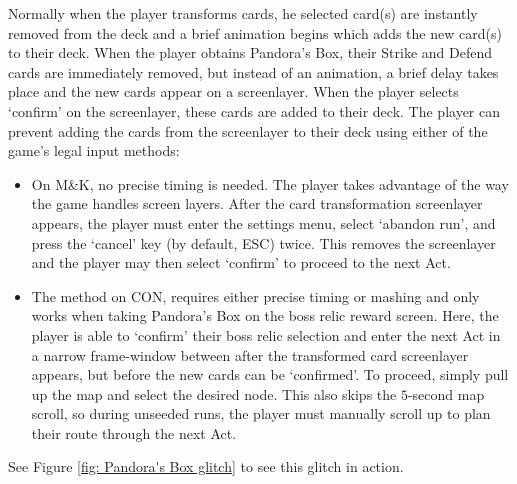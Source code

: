 \documentclass[12pt]{amsart}
\newcommand{\mk}{\textsf{M\&K}}
\newcommand{\con}{\textsf{CON}}
\begin{document}
Normally when the player transforms cards, he selected card(s) are instantly removed from the deck and a brief animation begins which adds the new card(s) to their deck.  
When the player obtains Pandora's Box, their Strike and Defend cards are immediately removed, but instead of an animation, a brief delay takes place and the new cards appear on a screenlayer.  
When the player selects `confirm' on the screenlayer, these cards are added to their deck.  
The player can prevent adding the cards from the screenlayer to their deck using either of the game's legal input methods: 
\begin{itemize}
    \item 
        On \mk, no precise timing is needed.  
        The player takes advantage of the way the game handles screen layers.  
        After the card transformation screenlayer appears, the player must enter the settings menu, select `abandon run', and press the `cancel' key (by default, \textrm{ESC}) twice.  
        This removes the screenlayer and the player may then select `confirm' to proceed to the next Act.  
    \item 
        The method on \con, requires either precise timing or mashing and only works when taking Pandora's Box on the boss relic reward screen.  
        Here, the player is able to  `confirm' their boss relic selection and enter the next Act in a narrow frame-window between after the transformed card screenlayer appears, but before the new cards can be `confirmed'.  
        To proceed, simply pull up the map and select the desired node. This also skips the $5$-second map scroll, so during unseeded runs, the player must manually scroll up to plan their route through the next Act.  
\end{itemize}
See Figure \ref{fig: Pandora's Box glitch} to see this glitch in action.  
\end{document}
